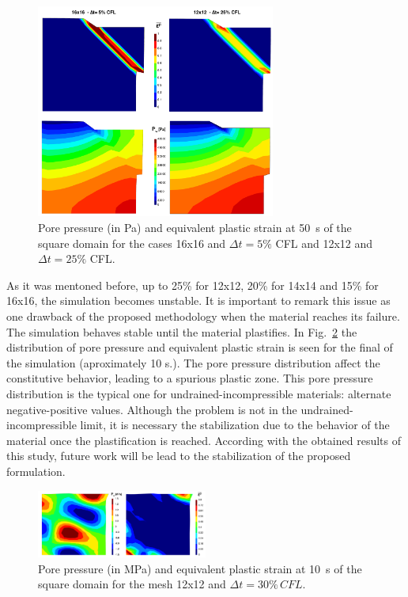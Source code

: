 \documentclass[twocolumn]{svjour3}          %
\begin{document}
{\begin{figure}
\centering
  \includegraphics[width=0.7\textwidth]{Fig/12-16.pdf}
\caption{Pore pressure (in Pa) and equivalent plastic strain at 50~s of the square domain for the cases 16x16 and $\Delta t=5\%$ CFL and 12x12 and $\Delta t=25\%$ CFL.}
\label{fig:dt2}      
\end{figure}

As it was mentoned before, up to 25\% for 12x12, 20\% for 14x14 and 15\% for 16x16, the simulation becomes unstable. It is important to remark this issue as one drawback of the proposed methodology when the material reaches its failure. The simulation behaves stable until the material plastifies. In Fig.~\ref{fig:dt3} the distribution of pore pressure and equivalent plastic strain is seen for the final of the simulation (aproximately 10 s.). The pore pressure distribution affect the constitutive behavior, leading to a spurious plastic zone. This pore pressure distribution is the typical one for undrained-incompressible materials: alternate negative-positive values. Although the problem is not in the undrained-incompressible limit, it is necessary the stabilization due to the behavior of the material once the plastification is reached. According with the obtained results of this study, future work will be lead to the stabilization of the proposed formulation.

\begin{figure}
  \includegraphics[width=0.50\textwidth]{Fig/failed.pdf}
\caption{Pore pressure (in MPa) and equivalent plastic strain at 10~s of the square domain for the mesh 12x12 and $\Delta t=30\%\,CFL$.}
\label{fig:dt3}      
\end{figure}

}
\end{document}
